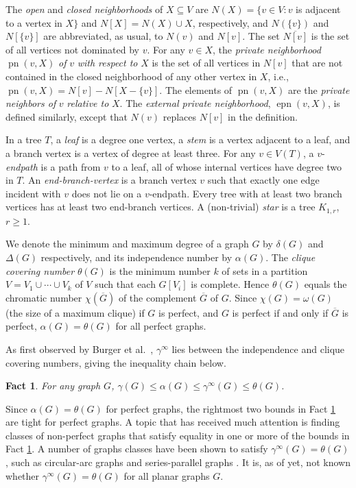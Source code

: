 \documentclass[12pt]{article}%
\newtheorem{Fact}[theorem]{Fact}
\begin{document}
\label{SecBack}The \emph{open} and \emph{closed neighborhoods} of $X\subseteq
V$ are $N(X)=\{v\in V:v$ is adjacent to a vertex in $X\}$ and $N[X]=N(X)\cup
X$, respectively, and $N(\{v\})$ and $N[\{v\}]$ are abbreviated, as usual, to
$N(v)$ and $N[v]$. The set $\overline{N[v]}$ is the set of all vertices not
dominated by $v$. For any $v\in X$, the \emph{private neighborhood}
$\operatorname{pn}(v,X)$\emph{ of }$v$\emph{ with respect to }$X$ is the set
of all vertices in $N[v]$ that are not contained in the closed neighborhood of
any other vertex in $X$, i.e., $\operatorname{pn}(v,X)=N[v]-N[X-\{v\}]$. The
elements of $\operatorname{pn}(v,X)$ are the \emph{private neighbors of }$v$
\emph{relative to }$X$. The \emph{external private neighborhood},
$\operatorname{epn}(v,X)$, is defined similarly, except that $N(v)$ replaces
$N[v]$ in the definition.

In a tree $T$, a \emph{leaf} is a degree one vertex, a \emph{stem} is a vertex
adjacent to a leaf, and a branch vertex is a vertex of degree at least three.
For any $v\in V(T)$, a $v$-\emph{endpath} is a path from $v$ to a leaf, all of
whose internal vertices have degree two in $T$. An \emph{end-branch-vertex} is
a branch vertex $v$ such that exactly one edge incident with $v$ does not lie
on a $v$-endpath. Every tree with at least two branch vertices has at least
two end-branch vertices. A (non-trivial) \emph{star} is a tree $K_{1,r}$,
$r\geq1$.

We denote the minimum and maximum degree of a graph $G$ by $\delta(G)$ and
$\Delta(G)$ respectively, and its independence number by $\alpha(G)$. The
\emph{clique covering number }$\theta(G)$ is the minimum number $k$ of sets in
a partition $V=V_{1}\cup\cdots\cup V_{k}$ of $V$ such that each $G[V_{i}]$ is
complete. Hence $\theta(G)$ equals the chromatic number $\chi(\overline{G})$
of the complement $\overline{G}$ of $G$. Since $\chi(G)=\omega(G)$ (the size
of a maximum clique) if $G$ is perfect, and $G$ is perfect if and only if
$\overline{G}$ is perfect, $\alpha(G)=\theta(G)$ for all perfect graphs.

As first observed by Burger et al.~\cite{BCG2}, $\gamma^{\infty}$ lies between
the independence and clique covering numbers, giving the inequality chain below.

\begin{Fact}
\label{FactED_Bound}For any graph $G$, $\gamma(G) \leq\alpha(G)\leq
\gamma^{\infty}(G)\leq\theta(G)$.
\end{Fact}

Since $\alpha(G)=\theta(G)$ for perfect graphs, the rightmost two bounds in
Fact \ref{FactED_Bound} are tight for perfect graphs. A topic that has
received much attention is finding classes of non-perfect graphs that satisfy
equality in one or more of the bounds in Fact \ref{FactED_Bound}. A number of
graphs classes have been shown to satisfy $\gamma^{\infty}(G)=\theta(G)$, such
as circular-arc graphs \cite{regan} and series-parallel graphs \cite{ABB}. It
is, as of yet, not known whether $\gamma^{\infty}(G)=\theta(G)$ for all planar
graphs $G$.
\end{document}
